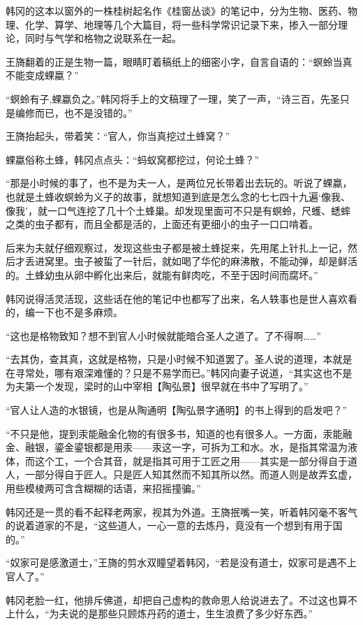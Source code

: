 韩冈的这本以窗外的一株桂树起名作《桂窗丛谈》的笔记中，分为生物、医药、物理、化学、算学、地理等几个大篇目，将一些科学常识记录下来，掺入一部分理论，同时与气学和格物之说联系在一起。

王旖翻着的正是生物一篇，眼睛盯着稿纸上的细密小字，自言自语的：“螟蛉当真不能变成蜾蠃？”

“螟蛉有子,蜾蠃负之。”韩冈将手上的文稿理了一理，笑了一声，“诗三百，先圣只是编修而已，也不是没错的。”

王旖抬起头，带着笑：“官人，你当真挖过土蜂窝？”

蜾蠃俗称土蜂，韩冈点点头：“蚂蚁窝都挖过，何论土蜂？”

“那是小时候的事了，也不是为夫一人，是两位兄长带着出去玩的。听说了蜾蠃，也就是土蜂收螟蛉为义子的故事，就想知道到底是怎么念的七七四十九遍‘像我、像我’，就一口气连挖了几十个土蜂巢。却发现里面可不只是有螟蛉，尺蠖、蟋蟀之类的虫子都有，而且全都是活的，上面还有更细小的虫子一口口啃着。

后来为夫就仔细观察过，发现这些虫子都是被土蜂捉来，先用尾上针扎上一记，然后才丢进窝里。虫子被蜇了一针后，就如喝了华佗的麻沸散，不能动弹，却是鲜活的。土蜂幼虫从卵中孵化出来后，就能有鲜肉吃，不至于因时间而腐坏。”

韩冈说得活灵活现，这些话在他的笔记中也都写了出来，名人轶事也是世人喜欢看的，编一下也不是多麻烦。

“这也是格物致知？想不到官人小时候就能暗合圣人之道了。了不得啊……”

“去其伪，查其真，这就是格物，只是小时候不知道罢了。圣人说的道理，本就是在寻常处，哪有艰深难懂的？只是不易学而已。”韩冈向妻子说道，“其实这也不是为夫第一个发现，梁时的山中宰相【陶弘景】很早就在书中了写明了。”

“官人让人造的水银镜，也是从陶通明【陶弘景字通明】的书上得到的启发吧？”

“不只是他，提到汞能融金化物的有很多书，知道的也有很多人。一方面，汞能融金、融银，鎏金鎏银都是用汞——汞这一字，可拆为工和水。水，是指其常温为液体，而这个工，一个合其音，就是指其可用于工匠之用——其实是一部分得自于道人，一部分得自于匠人。只是匠人知其然而不知其所以然。而道人则是故弄玄虚，用些模棱两可含含糊糊的话语，来招摇撞骗。”

韩冈还是一贯的看不起释老两家，视其为外道。王旖抿嘴一笑，听着韩冈毫不客气的说着道家的不是，“这些道人，一心一意的去炼丹，竟没有一个想到有用于国的。”

“奴家可是感激道士，”王旖的剪水双瞳望着韩冈，“若是没有道士，奴家可是遇不上官人了。”

韩冈老脸一红，他排斥佛道，却把自己虚构的救命恩人给说进去了。不过这也算不上什么，“为夫说的是那些只顾炼丹药的道士，生生浪费了多少好东西。”


